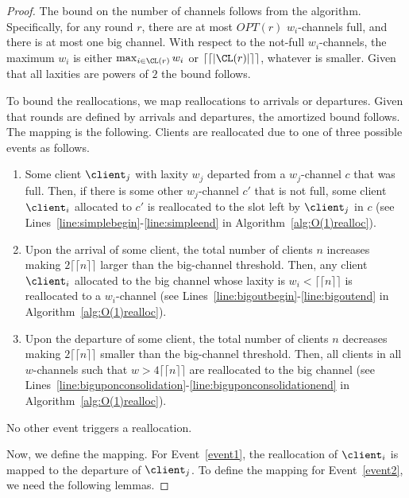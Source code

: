 \begin{proof}
The bound on the number of channels follows from the algorithm. Specifically, for any round $r$, there are at most $OPT(r)$ $w_i$-channels full, and there is at most one big channel. With respect to the not-full $w_i$-channels, the maximum $w_i$ is either $\max_{i\in\CL(r)}w_i$ or $\lceil\lceil|\CL(r)|\rceil\rceil$, whatever is smaller. Given that all laxities are powers of $2$ the bound follows.

To bound the reallocations, we map reallocations to arrivals or departures. Given that rounds are defined by arrivals and departures, the amortized bound follows. The mapping is the following. Clients are reallocated due to one of three possible events as follows. 

\begin{enumerate}
\item\label{event1}
Some client $\client_j$ with laxity $w_j$ departed from a $w_j$-channel $c$ that was full. Then, if there is some other $w_j$-channel $c'$ that is not full, some client $\client_i$ allocated to $c'$ is reallocated to the slot left by $\client_j$ in $c$ (see Lines~\ref{line:simplebegin}-\ref{line:simpleend} in Algorithm~\ref{alg:O(1)realloc}). 
\item\label{event2}
Upon the arrival of some client, the total number of clients $n$ increases making $2\lceil\lceil n \rceil\rceil$ larger than the big-channel threshold. Then, any client $\client_i$ allocated to the big channel whose laxity is $w_i<\lceil\lceil n \rceil\rceil$ is reallocated to a $w_i$-channel (see Lines~\ref{line:bigoutbegin}-\ref{line:bigoutend} in Algorithm~\ref{alg:O(1)realloc}). 
\item\label{event3}
Upon the departure of some client, the total number of clients $n$ decreases making $2\lceil\lceil n \rceil\rceil$ smaller than the big-channel threshold. Then, all clients in all $w$-channels such that $w>4\lceil\lceil n \rceil\rceil$ are reallocated to the big channel (see Lines~\ref{line:biguponconsolidation}-\ref{line:biguponconsolidationend} in Algorithm~\ref{alg:O(1)realloc}). 
\end{enumerate}
No other event triggers a reallocation. 

Now, we define the mapping. For Event~\ref{event1}, the reallocation of $\client_i$ is mapped to the departure of $\client_j$. To define the mapping for Event~\ref{event2}, we need the following lemmas.


\end{proof}
